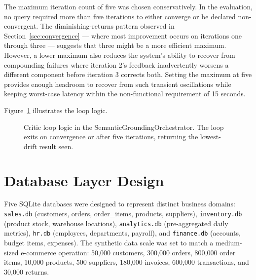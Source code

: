 \documentclass[12pt,a4paper]{report}
\begin{document}
The maximum iteration count of five was chosen conservatively. In the evaluation, no query required more than five iterations to either converge or be declared non-convergent. The diminishing-returns pattern observed in Section~\ref{sec:convergence} — where most improvement occurs on iterations one through three — suggests that three might be a more efficient maximum. However, a lower maximum also reduces the system's ability to recover from compounding failures where iteration 2's feedback inadvertently worsens a different component before iteration 3 corrects both. Setting the maximum at five provides enough headroom to recover from such transient oscillations while keeping worst-case latency within the non-functional requirement of 15 seconds.

Figure~\ref{fig:criticloop} illustrates the loop logic.

\begin{figure}[H]
  \centering
  \caption{Critic loop logic in the SemanticGroundingOrchestrator. The loop exits on convergence or after five iterations, returning the lowest-drift result seen.}
  \label{fig:criticloop}
\end{figure}

\section{Database Layer Design}
\label{sec:database-design}

Five SQLite databases were designed to represent distinct business domains: \texttt{sales.db} (customers, orders, order\_items, products, suppliers), \texttt{inventory.db} (product stock, warehouse locations), \texttt{analytics.db} (pre-aggregated daily metrics), \texttt{hr.db} (employees, departments, payroll), and \texttt{finance.db} (accounts, budget items, expenses). The synthetic data scale was set to match a medium-sized e-commerce operation: 50,000 customers, 300,000 orders, 800,000 order items, 10,000 products, 500 suppliers, 180,000 invoices, 600,000 transactions, and 30,000 returns.
\end{document}
